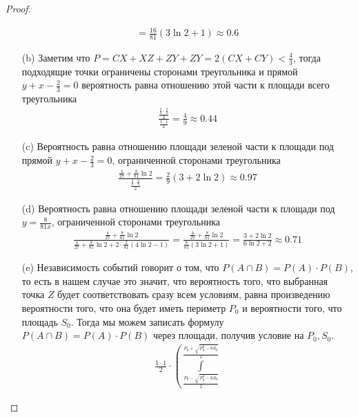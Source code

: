 \begin{proof}
\begin{itemize}
\begin{gather*}
                = \frac{16}{81}\left(3 \ln 2 + 1\right)
                \approx 0.6
            \end{gather*}
            \item[(b)] Заметим что $P = CX + XZ + ZY + ZY = 2(CX + CY) < \frac{4}{3}$, тогда подходящие точки ограничены сторонами треугольника и прямой $y + x - \frac{2}{3} = 0$  вероятность равна отношению этой части к площади всего треугольника
            \begin{gather*}
                \frac{\frac{\frac{2}{3} \cdot \frac{2}{3}}{2}}{\frac{1 \cdot 1}{2}}
                = \frac{4}{9}
                \approx 0.44
            \end{gather*}
            \item[(c)] Вероятность равна отношению площади зеленой части к площади под прямой $y + x - \frac{2}{3} = 0$, ограниченной сторонами треугольника
            \begin{gather*}
                \frac{\frac{4}{27} + \frac{8}{81} \ln 2}{\frac{\frac{2}{3} \cdot \frac{2}{3}}{2}}
                = \frac{2}{9}\left(3 + 2 \ln 2\right)
                \approx 0.97
            \end{gather*}
            \item[(d)] Вероятность равна отношению площади зеленой части к площади под $y = \frac{8}{81 x}$, ограниченной сторонами треугольника
            \begin{gather*}
                \frac{\frac{4}{27} + \frac{8}{81} \ln 2}{\frac{4}{27} + \frac{8}{81} \ln 2 + 2 \cdot \frac{2}{81} (4\ln 2 - 1)}
                = \frac{\frac{4}{27} + \frac{8}{81} \ln 2}{\frac{8}{81}(3 \ln 2 + 1)}
                = \frac{3 + 2 \ln 2}{6 \ln 2 + 2}
                \approx 0.71
            \end{gather*}
            \item[(e)] Независимость событий говорит о том, что $P(A \cap B) = P(A) \cdot P(B)$, то есть в нашем случае это значит, что вероятность того, что выбранная точка $Z$ будет соответствовать сразу всем условиям, равна произведению вероятности того, что она будет иметь периметр $P_0$ и вероятности того, что площадь $S_0$. Тогда мы можем записать формулу $P(A \cap B) = P(A) \cdot P(B)$ через площади, получив условие на $P_0, S_0$.
            \begin{gather*}
                \frac{1 \cdot 1}{2}
                \cdot \left(
                    \int\limits
                    _{\frac{P_0 - \sqrt{P_0^2 - 8S_0}}{2}}
                    ^{\frac{P_0 + \sqrt{P_0^2 - 8S_0}}{2}}

\end{gather*}
\end{itemize}
\end{proof}
